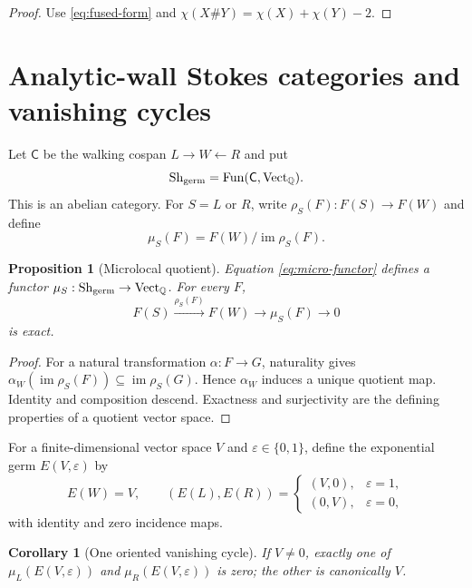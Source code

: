 \documentclass[11pt,a4paper]{amsart}
\theoremstyle{plain}
\newtheorem{proposition}[theorem]{Proposition}
\newtheorem{corollary}[theorem]{Corollary}
\theoremstyle{definition}
\newcommand{\QQ}{\mathbb Q}
\newcommand{\im}{\operatorname{im}}
\newcommand{\Sh}{\operatorname{Sh}}
\newcommand{\Vect}{\operatorname{Vect}}
\begin{document}
\begin{proof}
Use \eqref{eq:fused-form} and $\chi(X\#Y)=\chi(X)+\chi(Y)-2$.
\end{proof}

\section{Analytic-wall Stokes categories and vanishing cycles}\label{sec:cellular}

Let $\mathsf C$ be the walking cospan $L\to W\leftarrow R$ and put
\[
                         \Sh_{\rm germ}=\operatorname{Fun}(\mathsf C,\Vect_{\QQ}).
\]
This is an abelian category.  For $S=L$ or $R$, write
$\rho_S(F):F(S)\to F(W)$ and define
\begin{equation}\label{eq:micro-functor}
                         \mu_S(F)=F(W)/\im\rho_S(F).
\end{equation}

\begin{proposition}[Microlocal quotient]\label{prop:microfunctor}
Equation \eqref{eq:micro-functor} defines a functor
$\mu_S:\Sh_{\rm germ}\to\Vect_{\QQ}$.  For every $F$,
\begin{equation}\label{eq:nearby-vanishing}
       F(S)\xrightarrow{\rho_S(F)}F(W)\longrightarrow\mu_S(F)\longrightarrow0
\end{equation}
is exact.
\end{proposition}

\begin{proof}
For a natural transformation $\alpha:F\to G$, naturality gives
$\alpha_W(\im\rho_S(F))\subseteq\im\rho_S(G)$.  Hence $\alpha_W$ induces a unique quotient map.
Identity and composition descend.  Exactness and surjectivity are the defining properties of a
quotient vector space.
\end{proof}

For a finite-dimensional vector space $V$ and $\varepsilon\in\{0,1\}$, define the exponential
germ $E(V,\varepsilon)$ by
\[
 E(W)=V,\qquad (E(L),E(R))=
 \begin{cases}(V,0),&\varepsilon=1,\\(0,V),&\varepsilon=0,
 \end{cases}
\]
with identity and zero incidence maps.

\begin{corollary}[One oriented vanishing cycle]\label{cor:one-oriented}
If $V\ne0$, exactly one of $\mu_L(E(V,\varepsilon))$ and
$\mu_R(E(V,\varepsilon))$ is zero; the other is canonically $V$.
\end{corollary}
\end{document}
